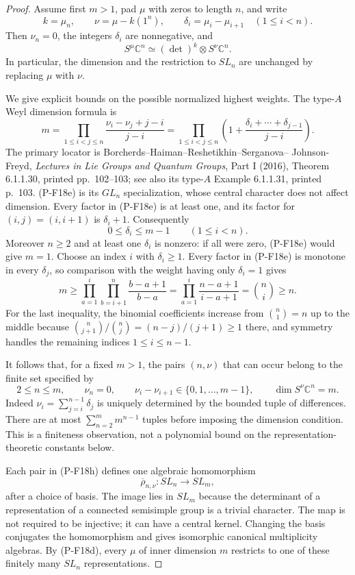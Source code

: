 \begin{proof}
Assume first $m>1$, pad $\mu$ with zeros to length $n$, and write
\[
 k=\mu_n,\qquad \nu=\mu-k(1^n),\qquad
 \delta_i=\mu_i-\mu_{i+1}\quad(1\le i<n).
\]
Then $\nu_n=0$, the integers $\delta_i$ are nonnegative, and
\[
 S^\mu\mathbb C^n\simeq
 (\det)^k\otimes S^\nu\mathbb C^n.
 \tag{P-F18d}
\]
In particular, the dimension and the restriction to $SL_n$ are
unchanged by replacing $\mu$ with $\nu$.

We give explicit bounds on the possible normalized highest weights.
The type-$A$ Weyl dimension formula is
\[
 m=\prod_{1\le i<j\le n}
       \frac{\nu_i-\nu_j+j-i}{j-i}
   =\prod_{1\le i<j\le n}
       \left(1+\frac{\delta_i+\cdots+\delta_{j-1}}{j-i}\right).
 \tag{P-F18e}
\]
The primary locator is Borcherds--Haiman--Reshetikhin--Serganova--
Johnson-Freyd, \emph{Lectures in Lie Groups and Quantum Groups},
Part I (2016), Theorem 6.1.1.30, printed pp.~102--103;
see also its type-$A$ Example 6.1.1.31, printed p.~103.
(P-F18e) is its $GL_n$ specialization, whose central character
does not affect dimension. Every factor in (P-F18e) is at least
one, and its factor for $(i,j)=(i,i+1)$ is $\delta_i+1$.
Consequently
\[
 0\le\delta_i\le m-1\qquad(1\le i<n).
 \tag{P-F18f}
\]
Moreover $n\ge2$ and at least one $\delta_i$ is nonzero: if all
were zero, (P-F18e) would give $m=1$.
Choose an index $i$ with $\delta_i\ge1$. Every factor in (P-F18e)
is monotone in every $\delta_j$, so comparison with the weight
having only $\delta_i=1$ gives
\[
 m\ge\prod_{a=1}^{i}\prod_{b=i+1}^{n}
                  \frac{b-a+1}{b-a}
   =\prod_{a=1}^{i}\frac{n-a+1}{i-a+1}
   =\binom ni\ge n.
 \tag{P-F18g}
\]
For the last inequality, the binomial coefficients increase from
$\binom n1=n$ up to the middle because
$\binom n{j+1}/\binom nj=(n-j)/(j+1)\ge1$ there, and symmetry
handles the remaining indices $1\le i\le n-1$.

It follows that, for a fixed $m>1$, the pairs $(n,\nu)$ that can
occur belong to the finite set specified by
\[
 2\le n\le m,\qquad \nu_n=0,\qquad
 \nu_i-\nu_{i+1}\in\{0,1,\ldots,m-1\},\qquad
 \dim S^\nu\mathbb C^n=m.
 \tag{P-F18h}
\]
Indeed $\nu_i=\sum_{j=i}^{n-1}\delta_j$ is uniquely determined
by the bounded tuple of differences. There are at most
$\sum_{n=2}^{m}m^{n-1}$ tuples before imposing the dimension
condition. This is a finiteness observation, not a polynomial bound
on the representation-theoretic constants below.

Each pair in (P-F18h) defines one algebraic homomorphism
\[
 \overline\rho_{n,\nu}:SL_n\longrightarrow SL_m,
 \tag{P-F18i}
\]
after a choice of basis. The image lies in $SL_m$ because the
determinant of a representation of a connected semisimple group is
a trivial character. The map is not required to be injective;
it can have a central kernel. Changing the basis conjugates the
homomorphism and gives isomorphic canonical multiplicity algebras.
By (P-F18d), every $\mu$ of inner dimension $m$ restricts to one
of these finitely many $SL_n$ representations.


\end{proof}
